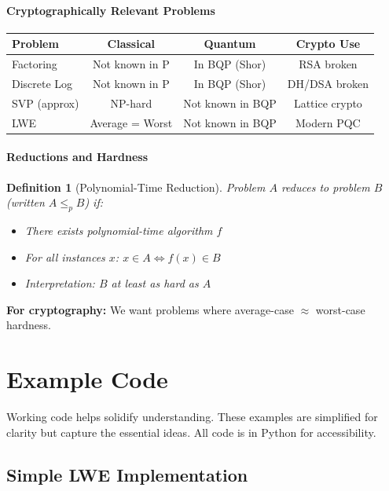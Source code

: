 \documentclass[11pt,a4paper]{article}
\newtheorem{definition}{Definition}
\begin{document}
\paragraph{Cryptographically Relevant Problems}

\begin{table}[h]
\centering
\begin{tabular}{|l|c|c|c|}
\hline
\textbf{Problem} & \textbf{Classical} & \textbf{Quantum} & \textbf{Crypto Use} \\
\hline
Factoring & Not known in P & In BQP (Shor) & RSA broken \\
Discrete Log & Not known in P & In BQP (Shor) & DH/DSA broken \\
SVP (approx) & NP-hard & Not known in BQP & Lattice crypto \\
LWE & Average = Worst & Not known in BQP & Modern PQC \\
\hline
\end{tabular}
\end{table}

\paragraph{Reductions and Hardness}

\begin{definition}[Polynomial-Time Reduction]
Problem $A$ reduces to problem $B$ (written $A \leq_p B$) if:
\begin{itemize}
    \item There exists polynomial-time algorithm $f$
    \item For all instances $x$: $x \in A \iff f(x) \in B$
    \item Interpretation: $B$ at least as hard as $A$
\end{itemize}
\end{definition}

\textbf{For cryptography:} We want problems where average-case $\approx$ worst-case hardness.

\section{Example Code}
\label{app:code}

Working code helps solidify understanding. These examples are simplified for clarity but capture the essential ideas. All code is in Python for accessibility.

\subsection{Simple LWE Implementation}
\label{app:lwe-code}
\end{document}
